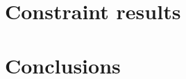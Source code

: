 \documentclass{aa}
\begin{document}
\section{Constraint results}

\section{Conclusions}



\end{document}
